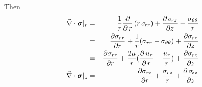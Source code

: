 Then 
\begin{eqnarray}
\vec\nabla \cdot {\bm \sigma}|_r
&=&  {1 \over r} {\partial \over \partial \, r} \left( r \, \sigma_{\!rr} \right) + 
{\partial \, \sigma_{\!rz} \over \partial z} - {\sigma_{\theta \theta} \over r} \\
&=& 
\frac{\partial \sigma_{rr}}{\partial r} + \frac1r (\sigma_{rr}-\sigma_{\theta \theta} ) + \frac{\partial \sigma_{rz}}{\partial z} \\
&=& 
\frac{\partial \sigma_{rr}}{\partial r} + \frac{2\mu}{r} 
({\partial \, u_r \over \partial \, r} - \frac{u_r}{r} ) 
+ \frac{\partial \sigma_{rz}}{\partial z} \\
\vec\nabla \cdot {\bm \sigma}|_z
&=& \frac{\partial \sigma_{rz}}{\partial r} + \frac{\sigma_{rz}}{r}
 + {\partial \, \sigma_{\!zz} \over \partial z} 
\end{eqnarray}





